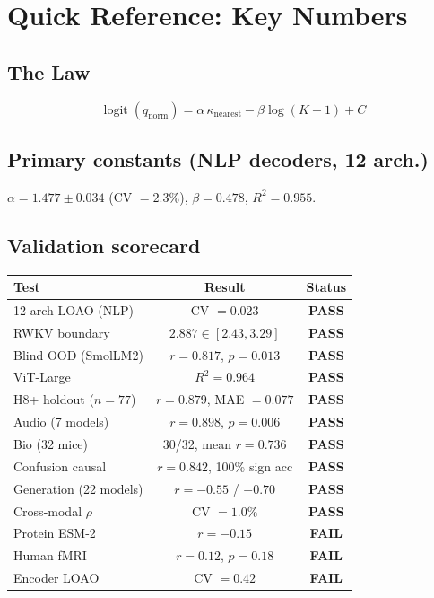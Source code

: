 \documentclass[11pt,a4paper]{article}
\DeclareMathOperator{\logit}{logit}
\begin{document}
\section{Quick Reference: Key Numbers}

\subsection{The Law}
\[
\logit(q_\mathrm{norm}) = \alpha\,\kappa_\mathrm{nearest} - \beta\log(K{-}1) + C
\]

\subsection{Primary constants (NLP decoders, 12 arch.)}
$\alpha = 1.477 \pm 0.034$ (CV $= 2.3\%$), $\beta = 0.478$, $R^2 = 0.955$.

\subsection{Validation scorecard}

\begin{center}
\small
\begin{tabular}{lcc}
\toprule
\textbf{Test} & \textbf{Result} & \textbf{Status} \\
\midrule
12-arch LOAO (NLP) & CV $= 0.023$ & \textcolor{ctigreen}{\textbf{PASS}} \\
RWKV boundary & $2.887 \in [2.43, 3.29]$ & \textcolor{ctigreen}{\textbf{PASS}} \\
Blind OOD (SmolLM2) & $r = 0.817$, $p = 0.013$ & \textcolor{ctigreen}{\textbf{PASS}} \\
ViT-Large & $R^2 = 0.964$ & \textcolor{ctigreen}{\textbf{PASS}} \\
H8+ holdout ($n{=}77$) & $r = 0.879$, MAE $= 0.077$ & \textcolor{ctigreen}{\textbf{PASS}} \\
Audio (7 models) & $r = 0.898$, $p = 0.006$ & \textcolor{ctigreen}{\textbf{PASS}} \\
Bio (32 mice) & 30/32, mean $r = 0.736$ & \textcolor{ctigreen}{\textbf{PASS}} \\
Confusion causal & $r = 0.842$, 100\% sign acc & \textcolor{ctigreen}{\textbf{PASS}} \\
Generation (22 models) & $r = -0.55$ / $-0.70$ & \textcolor{ctigreen}{\textbf{PASS}} \\
Cross-modal $\rho$ & CV $= 1.0\%$ & \textcolor{ctigreen}{\textbf{PASS}} \\
\midrule
Protein ESM-2 & $r = -0.15$ & \textcolor{ctired}{\textbf{FAIL}} \\
Human fMRI & $r = 0.12$, $p = 0.18$ & \textcolor{ctired}{\textbf{FAIL}} \\
Encoder LOAO & CV $= 0.42$ & \textcolor{ctired}{\textbf{FAIL}} \\
\bottomrule
\end{tabular}
\end{center}
\end{document}
